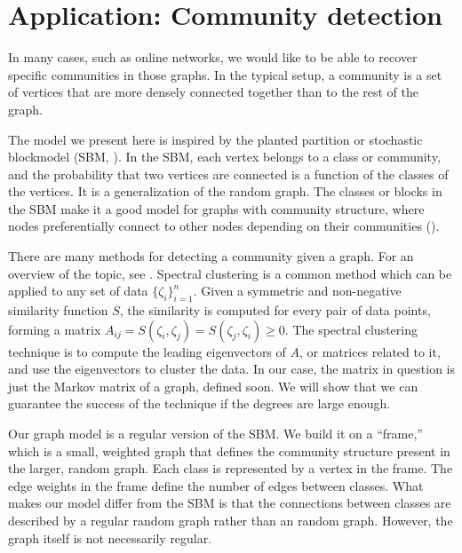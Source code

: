 \section{Application: Community detection}
\label{sec:communities}

In many cases, such as online networks, 
we would like to be able to recover specific communities in those graphs.
In the typical setup, a community is a set of vertices that are more densely connected
together than to the rest of the graph.

The model we present here
is inspired by the planted partition or
stochastic blockmodel (SBM, \citet*{holland1983}).
In the SBM, each vertex belongs to a class or community, 
and the probability that two vertices are connected is a function
of the classes of the  vertices.
It is a generalization of the \ER random graph.
The classes or blocks in the SBM make it a good model for
graphs with community structure, 
where nodes preferentially connect to other nodes
depending on their communities
(\citet*{newman2010}).

There are many methods for detecting a community given a graph.
For an overview of the topic, see \citet*{fortunato2010}.
Spectral clustering is a common method which can be applied to any set of data
$\{ \zeta_i \}_{i=1}^n$.
Given a symmetric and non-negative similarity function $S$,
the similarity is computed for every pair of data points, forming a matrix
$A_{ij} = S(\zeta_i, \zeta_j ) = S(\zeta_j, \zeta_i ) \geq 0$.
The spectral clustering technique is to compute the leading eigenvectors of
$A$, or matrices related to it, and use the eigenvectors to cluster the data.
In our case, the matrix in question is just the 
Markov matrix of a graph, defined soon.
We will show that we can guarantee the success of the technique if the degrees
are large enough.

Our graph model is a regular version of the SBM.
We build it on a ``frame,''
which is a small, weighted graph that
defines the community structure present in the larger, random graph.
Each class is represented by a vertex in the frame.
The edge weights in the frame define the number of edges
between classes.
What makes our model differ from the SBM is that
the connections between classes are described by a 
regular random graph rather than an \ER random graph.
However, the graph itself is not necessarily regular.

